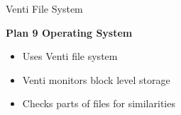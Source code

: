 \begin{frame}[t]{Venti File System}

  \hspace*{.6in}
  \begin{minipage}{3.5in}
  \begin{center}
	\vspace*{.3in}
	\textbf{Plan 9 Operating System}
	  
	  	\begin{itemize}
	\renewcommand{\labelitemi}{$\bullet$}
		\item Uses Venti file system
		\item Venti monitors block level storage
		\item Checks parts of files for similarities
	\end{itemize}
  \end{center}
  \end{minipage}

\end{frame}